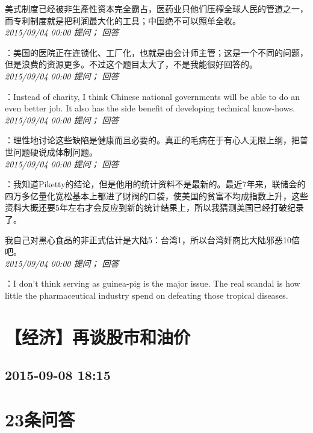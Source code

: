 \documentclass[twocolumn]{ctexart}
\begin{document}
美式制度已经被非生產性资本完全霸占，医药业只他们压榨全球人民的管道之一，而专利制度就是把利润最大化的工具；中国绝不可以照单全收。\\

\textit{\hfill\noindent\small 2015/09/04 00:00 提问； 回答}

：美国的医院正在连锁化、工厂化，也就是由会计师主管；这是一个不同的问题，但是浪费的资源更多。不过这个题目太大了，不是我能很好回答的。\\

\textit{\hfill\noindent\small 2015/09/04 00:00 提问； 回答}

：Instead of charity, I think Chinese national governments will be able to do an even better job. It also has the side benefit of developing technical know-hows.\\

\textit{\hfill\noindent\small 2015/09/04 00:00 提问； 回答}

：理性地讨论这些缺陷是健康而且必要的。真正的毛病在于有心人无限上纲，把普世问题硬说成体制问题。\\

\textit{\hfill\noindent\small 2015/09/04 00:00 提问； 回答}

：我知道Piketty的结论，但是他用的统计资料不是最新的。最近7年来，联储会的四万多亿量化宽松基本上都进了财阀的口袋，使美国的贫富不均成指数上升，这些资料大概还要5年左右才会反应到新的统计结果上，所以我猜测美国已经打破纪录了。

我自己对黑心食品的非正式估计是大陆5：台湾1，所以台湾奸商比大陆邪恶10倍吧。\\

\textit{\hfill\noindent\small 2015/09/04 00:00 提问； 回答}

：I don't think serving as guinea-pig is the major issue. The real scandal is how little the pharmaceutical industry spend on defeating those tropical diseases.\\


\section{【经济】再谈股市和油价}
\subsection{2015-09-08 18:15}


\section{23条问答}
\end{document}
